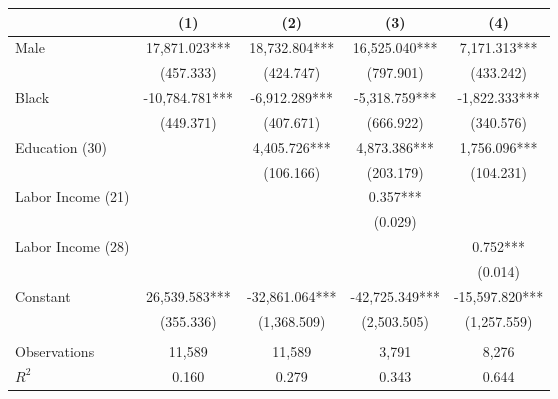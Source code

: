 \begin{tabular}{lcccc} \toprule
 & (1) & (2) & (3) & (4) \\ \midrule
Male & 17,871.023*** & 18,732.804*** & 16,525.040*** & 7,171.313*** \\
 & (457.333) & (424.747) & (797.901) & (433.242) \\
Black & -10,784.781*** & -6,912.289*** & -5,318.759*** & -1,822.333*** \\
 & (449.371) & (407.671) & (666.922) & (340.576) \\
 Education (30) &  & 4,405.726*** & 4,873.386*** & 1,756.096*** \\
 &  & (106.166) & (203.179) & (104.231) \\
Labor Income (21) &  &  & 0.357*** &  \\
 &  &  & (0.029) &  \\
Labor Income (28) &  &  &  & 0.752*** \\
 &  &  &  & (0.014) \\
Constant & 26,539.583*** & -32,861.064*** & -42,725.349*** & -15,597.820*** \\
 & (355.336) & (1,368.509) & (2,503.505) & (1,257.559) \\ \\ \midrule 
 Observations & 11,589 & 11,589 & 3,791 & 8,276 \\
$R^2$ & 0.160 & 0.279 & 0.343 & 0.644 \\ \bottomrule
\end{tabular}
